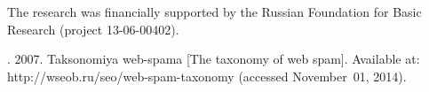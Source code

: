 \vspace*{-24pt}

\Ack

\vspace*{-4pt}

\noindent
The research was financially supported by the Russian Foundation for Basic Research
(project 13-06-00402).


\vspace*{-2pt}

  \begin{multicols}{2}



\renewcommand{\bibname}{\protect\rmfamily References}



{\small\frenchspacing
 {\baselineskip=10.8pt
 \begin{thebibliography}{99}

. 2007. Taksonomiya web-spama [The
taxonomy of web spam]. Available at: {\sf
http://wseob.ru/seo/web-spam-taxonomy} (accessed November~01, 2014).


\end{thebibliography}}}
\end{multicols}
